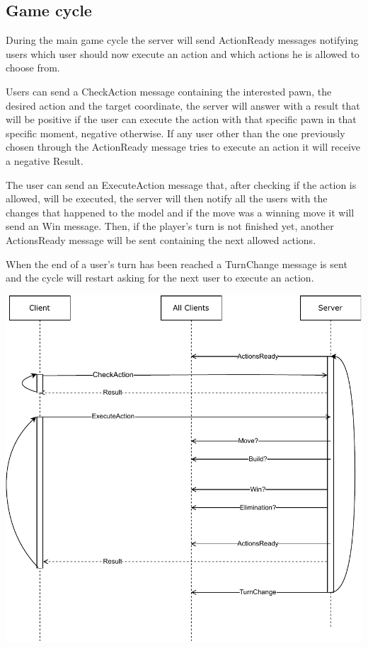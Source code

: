 \documentclass{article}
\begin{document}
\subsection*{Game cycle}

During the main game cycle the server will send ActionReady messages notifying users which user should now execute an action and which actions he is allowed to choose from. 

Users can send a CheckAction message containing the interested pawn, the desired action and the target coordinate, the server will answer with a result that will be positive if the user can execute the action with that specific pawn in that specific moment, negative otherwise. If any user other than the one previously chosen through the ActionReady message tries to execute an action it will receive a negative Result.

The user can send an ExecuteAction message that, after checking if the action is allowed, will be executed, the server will then notify all the users with the changes that happened to the model and if the move was a winning move it will send an Win message. Then, if the player's turn is not finished yet, another ActionsReady message will be sent containing the next allowed actions.

When the end of a user's turn has been reached a TurnChange message is sent and the cycle will restart asking for the next user to execute an action.

\vspace{8pt}
\includegraphics[width=0.85\linewidth]{communication_uml_3.pdf}
\end{document}
